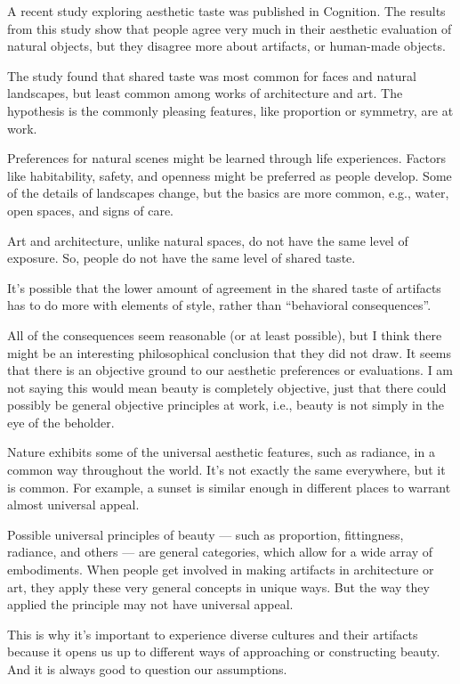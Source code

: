 \documentclass[UTF8,11pt]{ctexart}
\begin{document}
A recent study exploring aesthetic taste was published in Cognition. The results from this study show that people agree very much in their aesthetic evaluation of natural objects, but they disagree more about artifacts, or human-made objects.


The study found that shared taste was most common for faces and natural landscapes, but least common among works of architecture and art. The hypothesis is the commonly pleasing features, like proportion or symmetry, are at work.


Preferences for natural scenes might be learned through life experiences. Factors like habitability, safety, and openness might be preferred as people develop. Some of the details of landscapes change, but the basics are more common, e.g., water, open spaces, and signs of care.


Art and architecture, unlike natural spaces, do not have the same level of exposure. So, people do not have the same level of shared taste.


It’s possible that the lower amount of agreement in the shared taste of artifacts has to do more with elements of style, rather than “behavioral consequences”.


All of the consequences seem reasonable (or at least possible), but I think there might be an interesting philosophical conclusion that they did not draw. It seems that there is an objective ground to our aesthetic preferences or evaluations. I am not saying this would mean beauty is completely objective, just that there could possibly be general objective principles at work, i.e., beauty is not simply in the eye of the beholder.


Nature exhibits some of the universal aesthetic features, such as radiance, in a common way throughout the world. It’s not exactly the same everywhere, but it is common. For example, a sunset is similar enough in different places to warrant almost universal appeal.


Possible universal principles of beauty — such as proportion, fittingness, radiance, and others — are general categories, which allow for a wide array of embodiments. When people get involved in making artifacts in architecture or art, they apply these very general concepts in unique ways. But the way they applied the principle may not have universal appeal.


This is why it’s important to experience diverse cultures and their artifacts because it opens us up to different ways of approaching or constructing beauty. And it is always good to question our assumptions.
\end{document}
